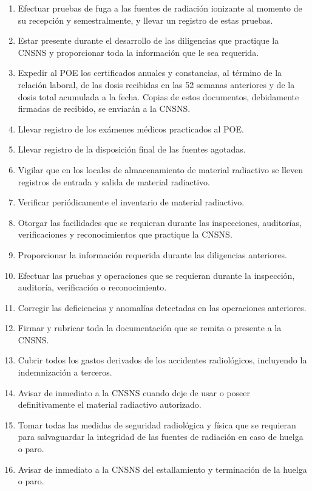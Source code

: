 \begin{enumerate}[label=\roman*)]
  \item Efectuar pruebas de fuga a las fuentes de radiación ionizante al momento de su recepción y semestralmente, y llevar un registro de estas pruebas.

  \item Estar presente durante el desarrollo de las diligencias que practique la CNSNS y proporcionar toda la información que le sea requerida.

  \item Expedir al POE los certificados anuales y constancias, al término de la relación laboral, de las dosis recibidas en las 52 semanas anteriores y de la dosis total acumulada a la fecha. Copias de estos documentos, debidamente firmadas de recibido, se enviarán a la CNSNS.

  \item Llevar registro de los exámenes médicos practicados al POE.

  \item Llevar registro de la disposición final de las fuentes agotadas.

  \item Vigilar que en los locales de almacenamiento de material radiactivo se lleven registros de entrada y salida de material radiactivo.

  \item Verificar periódicamente el inventario de material radiactivo.

  \item Otorgar las facilidades que se requieran durante las inspecciones, auditorías, verificaciones y reconocimientos que practique la CNSNS.

  \item Proporcionar la información requerida durante las diligencias anteriores.

  \item Efectuar las pruebas y operaciones que se requieran durante la inspección, auditoría, verificación o reconocimiento.

  \item Corregir las deficiencias y anomalías detectadas en las operaciones anteriores.

  \item Firmar y rubricar toda la documentación que se remita o presente a la CNSNS.

  \item Cubrir todos los gastos derivados de los accidentes radiológicos, incluyendo la indemnización a terceros.

  \item Avisar de inmediato a la CNSNS cuando deje de usar o poseer definitivamente el material radiactivo autorizado.

  \item Tomar todas las medidas de seguridad radiológica y física que se requieran para salvaguardar la integridad de las fuentes de radiación en caso de huelga o paro.

  \item Avisar de inmediato a la CNSNS del estallamiento y terminación de la huelga o paro.
\end{enumerate}

